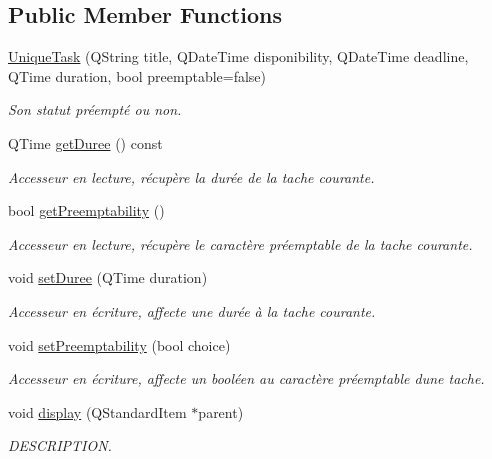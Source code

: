 \subsection*{Public Member Functions}
\begin{DoxyCompactItemize}
\item 
\hyperlink{class_unique_task_a84f23c7bc2027becd01e6542c25bc399}{Unique\+Task} (Q\+String title, Q\+Date\+Time disponibility, Q\+Date\+Time deadline, Q\+Time duration, bool preemptable=false)
\begin{DoxyCompactList}\small\item\em Son statut préempté ou non. \end{DoxyCompactList}\item 
Q\+Time \hyperlink{class_unique_task_a91ace1ffd87ac8f1a0508bf4ad52ead2}{get\+Duree} () const 
\begin{DoxyCompactList}\small\item\em Accesseur en lecture, récupère la durée de la tache courante. \end{DoxyCompactList}\item 
bool \hyperlink{class_unique_task_ac555928dbf9edfcbe0b646bbc94a1029}{get\+Preemptability} ()
\begin{DoxyCompactList}\small\item\em Accesseur en lecture, récupère le caractère préemptable de la tache courante. \end{DoxyCompactList}\item 
void \hyperlink{class_unique_task_a6c576a3ed9a589e622ccb63c64e0b637}{set\+Duree} (Q\+Time duration)
\begin{DoxyCompactList}\small\item\em Accesseur en écriture, affecte une durée à la tache courante. \end{DoxyCompactList}\item 
void \hyperlink{class_unique_task_af5a23e5030a8f345e4079abf7a01486e}{set\+Preemptability} (bool choice)
\begin{DoxyCompactList}\small\item\em Accesseur en écriture, affecte un booléen au caractère préemptable d\textquotesingle{}une tache. \end{DoxyCompactList}\item 
void \hyperlink{class_unique_task_a9daa05d6e38f45f6bed6434b4423b34e}{display} (Q\+Standard\+Item $\ast$parent)
\begin{DoxyCompactList}\small\item\em D\+E\+S\+C\+R\+I\+P\+T\+I\+O\+N. \end{DoxyCompactList}\item 

\end{DoxyCompactItemize}
